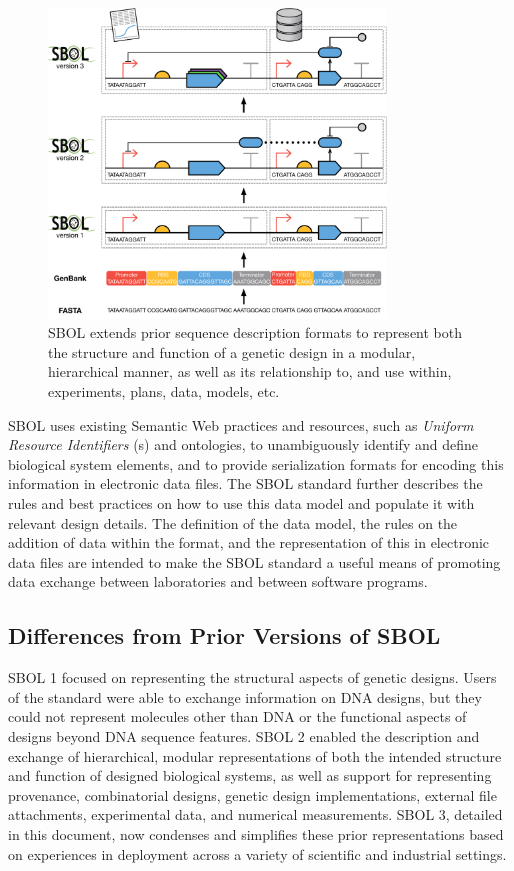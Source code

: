 \begin{figure}[htbp!]
\centering
\includegraphics[width=0.8\textwidth]{images/SBOL3-evolution.pdf}
\caption{SBOL extends prior sequence description formats to represent both the structure and function of a genetic design in a modular, hierarchical manner, as well as its relationship to, and use within, experiments, plans, data, models, etc.}
\label{f:sequence}
\end{figure}

SBOL uses existing Semantic Web practices and resources, such as \emph{Uniform Resource Identifiers} (s) and ontologies, to unambiguously identify and define biological system elements,
and to provide serialization formats for encoding this information in electronic data files.
The SBOL standard further describes the rules and best practices on how to use this data model and populate it with relevant design details. 
The definition of the data model, the rules on the addition of data within the format, and the representation of this in electronic data files are intended to make the SBOL standard a useful means of promoting data exchange between laboratories and between software programs.

\subsection*{Differences from Prior Versions of SBOL}

SBOL 1 focused on representing the structural aspects of genetic designs. Users of the standard were able to exchange information on DNA designs, but they could not represent molecules other than DNA or the functional aspects of designs beyond DNA sequence features. SBOL 2 enabled the description and exchange of hierarchical, modular representations of both the intended structure and function of designed biological systems, as well as support for representing provenance, combinatorial designs, genetic design implementations, external file attachments, experimental data, and numerical measurements. 
SBOL 3, detailed in this document, now condenses and simplifies these prior representations based on experiences in deployment across a variety of scientific and industrial settings.

